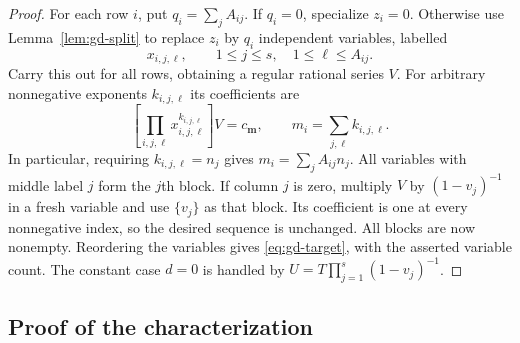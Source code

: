 \documentclass[11pt,a4paper]{article}
\theoremstyle{remark}\newtheorem{remark}[theorem]{Remark}
\begin{document}
\begin{proof}
For each row $i$, put $q_i=\sum_j A_{ij}$.  If $q_i=0$, specialize
$z_i=0$.  Otherwise use Lemma~\ref{lem:gd-split} to replace $z_i$ by
$q_i$ independent variables, labelled
\[
 x_{i,j,\ell},\qquad 1\le j\le s,\quad1\le\ell\le A_{ij}.
\]
Carry this out for all rows, obtaining a regular rational series $V$.
For arbitrary nonnegative exponents $k_{i,j,\ell}$ its coefficients are
\begin{equation}
 \left[\prod_{i,j,\ell}x_{i,j,\ell}^{k_{i,j,\ell}}\right]V
 =c_{\boldsymbol m},\qquad
 m_i=\sum_{j,\ell}k_{i,j,\ell}.
 \label{eq:gd-split-array}
\end{equation}
In particular, requiring $k_{i,j,\ell}=n_j$ gives
$m_i=\sum_j A_{ij}n_j$.  All variables with middle label $j$ form
the $j$th block.  If column $j$ is zero, multiply $V$ by
$(1-v_j)^{-1}$ in a fresh variable and use $\{v_j\}$ as that block.
Its coefficient is one at every nonnegative index, so the desired
sequence is unchanged.  All blocks are now nonempty.  Reordering the
variables gives \eqref{eq:gd-target}, with the asserted variable count.
The constant case $d=0$ is handled by
$U=T\prod_{j=1}^s(1-v_j)^{-1}$.
\end{proof}

\subsection{Proof of the characterization}
\end{document}
